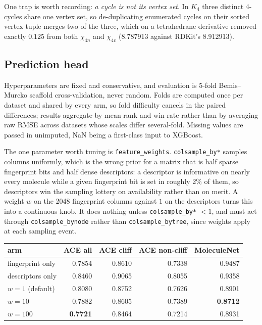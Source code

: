 One trap is worth recording: \emph{a cycle is not its vertex set}. In $K_4$ three distinct
4-cycles share one vertex set, so de-duplicating enumerated cycles on their sorted vertex tuple
merges two of the three, which on a tetrahedrane derivative removed exactly $0.125$ from both
$\chi_{4n}$ and $\chi_{4v}$ (8.787913 against RDKit's 8.912913).

\subsection{Prediction head}

Hyperparameters are fixed and conservative, and evaluation is 5-fold Bemis--Murcko scaffold
cross-validation, never random. Folds are computed once per dataset and shared by every arm, so
fold difficulty cancels in the paired differences; results aggregate by mean rank and win-rate
rather than by averaging raw RMSE across datasets whose scales differ several-fold. Missing
values are passed in unimputed, NaN being a first-class input to XGBoost.

The one parameter worth tuning is \texttt{feature\_weights}. \texttt{colsample\_by*} samples
columns uniformly, which is the wrong prior for a matrix that is half sparse fingerprint bits
and half dense descriptors: a descriptor is informative on nearly every molecule while a given
fingerprint bit is set in roughly 2\% of them, so descriptors win the sampling lottery on
availability rather than on merit. A weight $w$ on the 2048 fingerprint columns against $1$ on
the descriptors turns this into a continuous knob. It does nothing unless
\texttt{colsample\_by*} $< 1$, and must act through \texttt{colsample\_bynode} rather than
\texttt{colsample\_bytree}, since weights apply at each sampling event.

\begin{center}
\begin{tabular}{lrrrr}
\toprule
arm & ACE all & ACE cliff & ACE non-cliff & MoleculeNet \\
\midrule
fingerprint only & 0.7854 & 0.8610 & 0.7338 & 0.9487 \\
descriptors only & 0.8460 & 0.9065 & 0.8055 & 0.9358 \\
$w = 1$ (default) & 0.8080 & 0.8752 & 0.7626 & 0.8901 \\
$w = 10$ & 0.7882 & 0.8605 & 0.7389 & \textbf{0.8712} \\
$w = 100$ & \textbf{0.7721} & 0.8464 & 0.7214 & 0.8931 \\
\bottomrule
\end{tabular}
\end{center}

